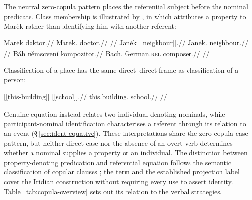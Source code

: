 The neutral zero-copula pattern places the referential subject before the
nominal predicate. Class membership is illustrated by 
, in which  attributes a property to
Marėk rather than identifying him with another referent:

\pex
\a
\begingl
\gla Marėk doktor.//
\glb Marėk.\Dir{} doctor.\Dir{}//
\glft {}//
\endgl
\a
\begingl
\gla Janėk \textnormal{[[neighbour]]}\textsubscript{\Dir{}}.//
\glb Janėk.\Dir{} neighbour.\Dir{}//
\glft {}
//
\endgl
\a
\begingl
\gla Báh němscvení kompozitor.//
\glb Bach.\Dir{} German.\textsc{rel} composer.\Dir{}//
\glft {}
//
\endgl
\xe

Classification of a place has the same direct--direct frame as
classification of a person:

\ex\label{ex:predicate-place-classification}%
\begingl
\gla \textnormal{[[this-building]]}\textsubscript{\Dir{}} \textnormal{[[school]]}\textsubscript{\Dir{}}.//
\glb this.building.\Dir{} school.\Dir{}//
\glft {}
//
\endgl
\xe

Genuine equation instead relates two individual-denoting nominals, while
participant-nominal identification characterises a referent through its
relation to an event (§\,\ref{sec:ident-equative}). These interpretations
share the zero-copula case pattern, but neither direct case nor the absence
of an overt verb determines whether a nominal supplies a property or an
individual. The distinction between property-denoting predication and
referential equation follows the semantic classification of copular clauses
\cite[§2.1]{djarv2021}; the term  and the established
projection label  cover the Iridian construction without
requiring every use to assert identity. Table~\ref{tab:copula-overview}
sets out its relation to the verbal strategies.

